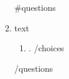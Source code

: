 \documentclass{article}
\begin{document}
  \begin{enumerate}
    {{#questions}}
      \item {{{text}}}
      \begin{enumerate}
        {{#choices}}
          \item {{.}}
        {{/choices}}
      \end{enumerate}
    {{/questions}}
  \end{enumerate}
\end{document}
